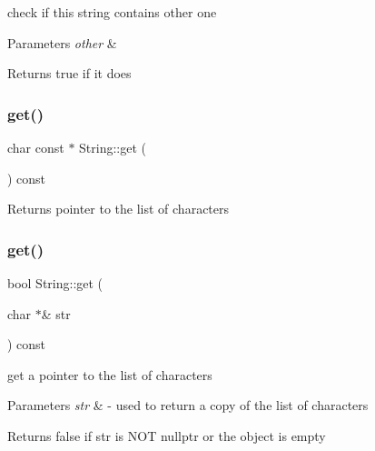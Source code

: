 check if this string contains other one 
\begin{DoxyParams}{Parameters}
{\em other} & \\
\hline
\end{DoxyParams}
\begin{DoxyReturn}{Returns}
true if it does 
\end{DoxyReturn}
\mbox{\label{classString_ac7459c7a9d75bdcc53d44a0c5ec7a182}} 
\subsubsection{\texorpdfstring{get()}{get()}\hspace{0.1cm}{\footnotesize\ttfamily [1/2]}}
{\footnotesize\ttfamily char const  $\ast$ String\+::get (\begin{DoxyParamCaption}{ }\end{DoxyParamCaption}) const}

\begin{DoxyReturn}{Returns}
pointer to the list of characters 
\end{DoxyReturn}
\mbox{\label{classString_ad11aaf7841686006dd6840a5fab5664e}} 
\subsubsection{\texorpdfstring{get()}{get()}\hspace{0.1cm}{\footnotesize\ttfamily [2/2]}}
{\footnotesize\ttfamily bool String\+::get (\begin{DoxyParamCaption}\item[{char $\ast$\&}]{str }\end{DoxyParamCaption}) const}

get a pointer to the list of characters 
\begin{DoxyParams}{Parameters}
{\em str} & -\/ used to return a copy of the list of characters \\
\hline
\end{DoxyParams}
\begin{DoxyReturn}{Returns}
false if str is N\+OT nullptr or the object is empty 
\end{DoxyReturn}
\mbox{\label{classString_a3a8304a7fe06a23f1750629a9186d346}} 

